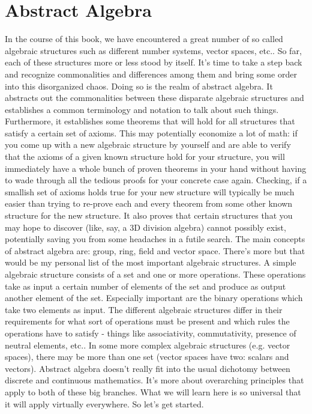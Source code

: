 \chapter{Abstract Algebra}
In the course of this book, we have encountered a great number of so called algebraic structures such as different number systems, vector spaces, etc.. So far, each of these structures more or less stood by itself. It's time to take a step back and recognize commonalities and differences among them and bring some order into this disorganized chaos. Doing so is the realm of abstract algebra. It abstracts out the commonalities between these disparate algebraic structures and establishes a common terminology and notation to talk about such things. Furthermore, it establishes some theorems that will hold for all structures that satisfy a certain set of axioms. This may potentially economize a lot of math: if you come up with a new algebraic structure by yourself and are able to verify that the axioms of a given known structure hold for your structure, you will immediately have a whole bunch of proven theorems in your hand without having to wade through all the tedious proofs for your concrete case again. Checking, if a smallish set of axioms holds true for your new structure will typically be much easier than trying to re-prove each and every theorem from some other known structure for the new structure. It also proves that certain structures that you may hope to discover (like, say, a 3D division algebra) cannot possibly exist, potentially saving you from some headaches in a futile search. The main concepts of abstract algebra are: group, ring, field and vector space. There's more but that would be my personal list of the most important algebraic structures. A simple algebraic structure consists of a set and one or more operations. These operations take as input a certain number of elements of the set and produce as output another element of the set. Especially important are the binary operations which take two elements as input. The different algebraic structures differ in their requirements for what sort of operations must be present and which rules the operations have to satisfy - things like associativity, commutativity, presence of neutral elements, etc.. In some more complex algebraic structures (e.g. vector spaces), there may be more than one set (vector spaces have two: scalars and vectors). Abstract algebra doesn't really fit into the usual dichotomy between discrete and continuous mathematics. It's more about overarching principles that apply to both of these big branches. What we will learn here is so universal that it will apply virtually everywhere. So let's get started.

